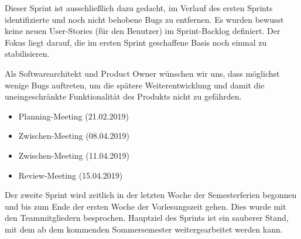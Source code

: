 Dieser Sprint ist ausschließlich dazu gedacht, im Verlauf des ersten Sprints identifizierte und noch nicht behobene Bugs zu entfernen. Es wurden bewusst keine neuen User-Stories (für den Benutzer) im Sprint-Backlog definiert. Der Fokus liegt darauf, die im ersten Sprint geschaffene Basis noch einmal zu stabilisieren.
\nsecend

Als Softwarearchitekt und Product Owner wünschen wir uns, dass möglichst wenige Bugs auftreten, um die spätere Weiterentwicklung und damit die uneingeschränkte Funktionalität des Produkts nicht zu gefährden.
\nsecend
\nsecend %

\nsecend%

\begin{itemize}
\item Planning-Meeting (21.02.2019)
\item Zwischen-Meeting (08.04.2019)
\item Zwischen-Meeting (11.04.2019)
\item Review-Meeting (15.04.2019)
\end{itemize}
\nsecend%

Der zweite Sprint wird zeitlich in der letzten Woche der Semesterferien begonnen und bis zum Ende der ersten Woche der Vorlesungszeit gehen. Dies wurde mit den Teammitgliedern besprochen. Hauptziel des Sprints ist ein sauberer Stand, mit dem ab dem kommenden Sommersemester weitergearbeitet werden kann.
\nsecend

